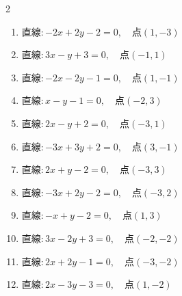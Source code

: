 \begin{multicols}{2}
\begin{enumerate}
  \item $直線:-2x+2y-2=0,\quad 点 ( 1, -3 )$


  \item $直線:3x-y+3=0,\quad 点 ( -1, 1 )$


  \item $直線:-2x-2y-1=0,\quad 点 ( 1, -1 )$


  \item $直線:x-y-1=0,\quad 点 ( -2, 3 )$


  \item $直線:2x-y+2=0,\quad 点 ( -3, 1 )$


  \item $直線:-3x+3y+2=0,\quad 点 ( 3, -1 )$


  \item $直線:2x+y-2=0,\quad 点 ( -3, 3 )$


\columnbreak %

\resetques

  \item $直線:-3x+2y-2=0,\quad 点 ( -3, 2 )$


  \item $直線:-x+y-2=0,\quad 点 ( 1, 3 )$

        \phantom{$\displaystyle 距離 : 0$}

  \item $直線:3x-2y+3=0,\quad 点 ( -2, -2 )$


  \item $直線:2x+2y-1=0,\quad 点 ( -3, -2 )$


  \item $直線:2x-3y-3=0,\quad 点 ( 1, -2 )$


\end{enumerate}
\end{multicols}
